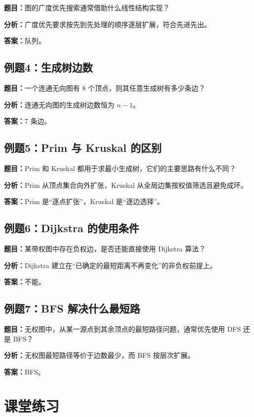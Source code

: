 \documentclass{../../note}
\begin{document}
\textbf{题目：}图的广度优先搜索通常借助什么线性结构实现？

\textbf{分析：}广度优先要求按先到先处理的顺序逐层扩展，符合先进先出。

\textbf{答案：}队列。

\subsection{例题4：生成树边数}

\textbf{题目：}一个连通无向图有 8 个顶点，则其任意生成树有多少条边？

\textbf{分析：}连通无向图的生成树边数恒为 $n-1$。

\textbf{答案：}7 条边。

\subsection{例题5：Prim 与 Kruskal 的区别}

\textbf{题目：}Prim 和 Kruskal 都用于求最小生成树，它们的主要思路有什么不同？

\textbf{分析：}Prim 从顶点集合向外扩张，Kruskal 从全局边集按权值筛选且避免成环。

\textbf{答案：}Prim 是“逐点扩张”，Kruskal 是“逐边选择”。

\subsection{例题6：Dijkstra 的使用条件}

\textbf{题目：}某带权图中存在负权边，是否还能直接使用 Dijkstra 算法？

\textbf{分析：}Dijkstra 建立在“已确定的最短距离不再变化”的非负权前提上。

\textbf{答案：}不能。

\subsection{例题7：BFS 解决什么最短路}

\textbf{题目：}无权图中，从某一源点到其余顶点的最短路径问题，通常优先使用 DFS 还是 BFS？

\textbf{分析：}无权图最短路径等价于边数最少，而 BFS 按层次扩展。

\textbf{答案：}BFS。

\section{课堂练习}
\end{document}
